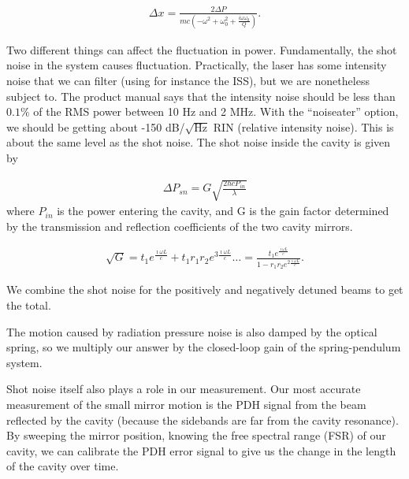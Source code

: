 \begin{eqnarray}
\Delta x = \frac{2 \Delta P}{{m c \left(-\omega^2+\omega_0^2+\frac{i\omega\omega_0}{Q}\right)}}.
\label{eq:dx/dP}
\end{eqnarray}


Two different things can affect the fluctuation in power.  Fundamentally, the shot noise in the system causes fluctuation.  Practically, the laser has some intensity noise that we can filter (using for instance the ISS), but we are nonetheless subject to.  The product manual says that the intensity noise should be less than $0.1\%$ of the RMS power between 10 Hz and 2 MHz.  With the ``noiseater'' option, we should be getting about -150 dB/$\sqrt{\mbox{Hz}}$ RIN (relative intensity noise).  This is about the same level as the shot noise.  The shot noise inside the cavity is given by

\begin{eqnarray}
\Delta P_{sn} = G\sqrt{\frac{2 h c P_{in}}{\lambda }}
\label{eq:sn}
\end{eqnarray}
where $P_{in}$ is the power entering the cavity, and G is the gain factor determined by the transmission and reflection coefficients of the two cavity mirrors.

\begin{eqnarray}
\sqrt{G} = t_1 e^{\frac{\imath \omega L}{c}} + t_1 r_1 r_2 e^{3\frac{\imath \omega L}{c}} \ldots = \frac{t_1 e^{\frac{\imath \omega L}{c}}}{1-r_1 r_2 e^{2\frac{\imath \omega L}{c}}}.
\label{eq:G}
\end{eqnarray}

We combine the shot noise for the positively and negatively detuned beams to get the total.

The motion caused by radiation pressure noise is also damped by the optical spring, so we multiply our answer by the closed-loop gain of the
spring-pendulum system.


Shot noise itself also plays a role in our measurement.  Our most accurate measurement of the small mirror motion is the PDH signal from the beam reflected by the cavity (because the sidebands are far from the cavity resonance).  By sweeping the mirror position, knowing the free spectral range (FSR) of our cavity, we can calibrate the PDH error signal to give us the change in the length of the cavity over time.

